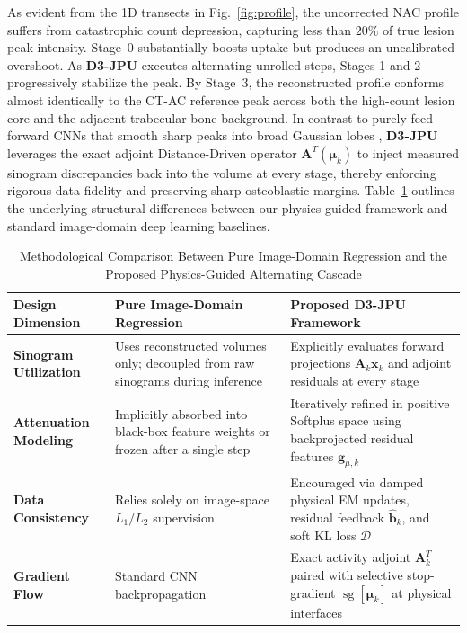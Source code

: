 \documentclass[11pt, a4paper]{article}
\begin{document}
As evident from the 1D transects in Fig.~\ref{fig:profile}, the uncorrected NAC profile suffers from catastrophic count depression, capturing less than $20\%$ of true lesion peak intensity. Stage~0 substantially boosts uptake but produces an uncalibrated overshoot. As \textbf{D3-JPU} executes alternating unrolled steps, Stages 1 and 2 progressively stabilize the peak. By Stage~3, the reconstructed profile conforms almost identically to the CT-AC reference peak across both the high-count lesion core and the adjacent trabecular bone background. In contrast to purely feed-forward CNNs that smooth sharp peaks into broad Gaussian lobes \cite{ref18}, \textbf{D3-JPU} leverages the exact adjoint Distance-Driven operator $\mathbf{A}^T(\boldsymbol{\mu}_k)$ to inject measured sinogram discrepancies back into the volume at every stage, thereby enforcing rigorous data fidelity and preserving sharp osteoblastic margins. Table~\ref{tab:mechanism} outlines the underlying structural differences between our physics-guided framework and standard image-domain deep learning baselines.

\begin{table}[htbp]
\centering
\caption{Methodological Comparison Between Pure Image-Domain Regression and the Proposed Physics-Guided Alternating Cascade}
\label{tab:mechanism}
\small
\begin{tabularx}{\textwidth}{l X X}
\toprule
\textbf{Design Dimension} & \textbf{Pure Image-Domain Regression} & \textbf{Proposed D3-JPU Framework} \\
\midrule
\textbf{Sinogram Utilization} & Uses reconstructed volumes only; decoupled from raw sinograms during inference & Explicitly evaluates forward projections $\mathbf{A}_k \mathbf{x}_k$ and adjoint residuals at every stage \\
\textbf{Attenuation Modeling} & Implicitly absorbed into black-box feature weights or frozen after a single step & Iteratively refined in positive Softplus space using backprojected residual features $\mathbf{g}_{\mu,k}$ \\
\textbf{Data Consistency} & Relies solely on image-space $L_1/L_2$ supervision & Encouraged via damped physical EM updates, residual feedback $\widehat{\mathbf{b}}_k$, and soft KL loss $\mathcal{D}$ \\
\textbf{Gradient Flow} & Standard CNN backpropagation & Exact activity adjoint $\mathbf{A}_k^T$ paired with selective stop-gradient $\operatorname{sg}[\boldsymbol{\mu}_k]$ at physical interfaces \\
\bottomrule
\end{tabularx}
\end{table}
\end{document}
